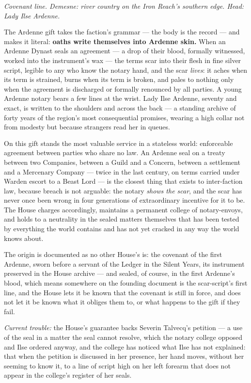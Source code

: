 \textit{Covenant line. Demesne: river country on the Iron Reach's southern edge. Head: Lady Ilse Ardenne.}

The Ardenne gift takes the faction's grammar --- the body is the record --- and makes it literal: \textbf{oaths write themselves into Ardenne skin.} When an Ardenne Dynast seals an agreement --- a drop of their blood, formally witnessed, worked into the instrument's wax --- the terms scar into their flesh in fine silver script, legible to any who know the notary hand, and the scar \textit{lives}: it aches when its term is strained, burns when its term is broken, and pales to nothing only when the agreement is discharged or formally renounced by all parties. A young Ardenne notary bears a few lines at the wrist. Lady Ilse Ardenne, seventy and exact, is written to the shoulders and across the back --- a standing archive of forty years of the region's most consequential promises, wearing a high collar not from modesty but because strangers read her in queues.

On this gift stands the most valuable service in a stateless world: enforceable agreement between parties who share no law. An Ardenne seal on a treaty between two Companies, between a Guild and a Concern, between a settlement and a Mercenary Company --- twice in the last century, on terms carried under Warden escort to a Beast Lord --- is the closest thing that exists to inter-faction law, because breach is not arguable: the notary \textit{shows the scar}, and the scar has never once been wrong in four generations of extraordinary incentive for it to be. The House charges accordingly, maintains a permanent college of notary-envoys, and holds to a neutrality in the sealed matters themselves that has been tested by everything the world contains and has not yet cracked in any way the world knows about.

The origin is documented as no other House's is: the covenant of the first Ardenne, sworn before a servant of the Ledger in the Silent Years, its instrument preserved in the House archive --- and sealed, of course, in the first Ardenne's blood, which means somewhere on the founding document is the scar-script's first line, and the House lets it be known that the covenant is still in force, and does not let it be known what it obliges them to, or what happens to the gift if they fail.

\textit{Current trouble:} the House's guarantee backs Severin Talvecq's petition --- a use of the seal in a matter the seal cannot resolve, which the notary college opposed and Ilse ordered anyway, and the college has noticed what Ilse has not explained: that when the petition is discussed in her presence, her hand moves, without her seeming to know it, to a line of script high on her left forearm that does not appear in the college's register of her seals.


